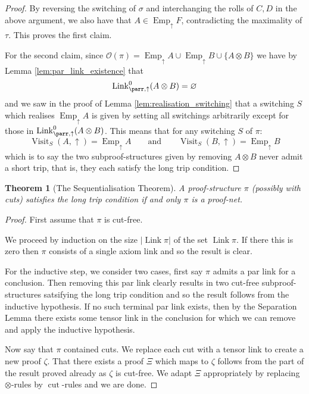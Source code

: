 \documentclass[12pt]{article}
\theoremstyle{plain}
\newtheorem{thm}{Theorem}[subsection] %
\theoremstyle{definition}
\newcommand{\call}[1]{\mathcal{#1}}
\begin{document}
\begin{proof}
By reversing the switching of $\sigma$ and interchanging the rolls of $C,D$ in the above argument, we also have that $A \in \operatorname{Emp}_{\uparrow}F$, contradicting the maximality of $\tau$. This proves the first claim.

For the second claim, since $\call{O}(\pi) = \operatorname{Emp}_{\uparrow}A \cup \operatorname{Emp}_{\uparrow}B \cup \lbrace A \otimes B\rbrace$ we have by Lemma \ref{lem:par_link_existence} that
\begin{equation}
    \operatorname{Link}_{\parr,\uparrow}^0(A\otimes B) = \varnothing
\end{equation}
and we saw in the proof of Lemma \ref{lem:realisation_switching} that a switching $S$ which realises $\operatorname{Emp}_{\uparrow}A$ is given by setting all switchings arbitrarily except for those in $\operatorname{Link}_{\parr,\uparrow}^0(A\otimes B)$. This means that for any switching $S$ of $\pi$:
\begin{equation}
    \operatorname{Visit}_{S}(A,\uparrow) = \operatorname{Emp}_{\uparrow}A \qquad\text{and}\qquad \operatorname{Visit}_{S}(B,\uparrow) = \operatorname{Emp}_{\uparrow}B
\end{equation}
which is to say the two subproof-structures given by removing $A \otimes B$ never admit a short trip, that is, they each satisfy the long trip condition.
\end{proof}
\begin{thm}[The Sequentialisation Theorem]\label{thm:sequentialisation}
A proof-structure $\pi$ (possibly with cuts) satisfies the long trip condition if and only $\pi$ is a proof-net.
\end{thm}
\begin{proof}
First assume that $\pi$ is cut-free.

We proceed by induction on the size $|\operatorname{Link}\pi|$ of the set $\operatorname{Link}\pi$. If there this is zero then $\pi$ consists of a single axiom link and so the result is clear.

For the inductive step, we consider two cases, first say $\pi$ admits a par link for a conclusion. Then removing this par link clearly results in two cut-free subproof-structures satsifying the long trip condition and so the result follows from the inductive hypothesis. If no such terminal par link exists, then by the Separation Lemma there exists some tensor link in the conclusion for which we can remove and apply the inductive hypothesis.

Now say that $\pi$ contained cuts. We replace each cut with a tensor link to create a new proof $\zeta$. That there exists a proof $\Xi$ which maps to $\zeta$ follows from the part of the result proved already as $\zeta$ is cut-free. We adapt $\Xi$ appropriately by replacing $\otimes$-rules by $\operatorname{cut}$-rules and we are done.
\end{proof}
\end{document}
